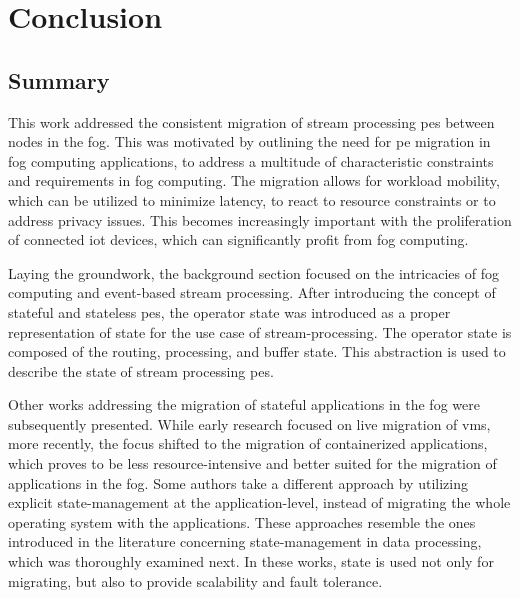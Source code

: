 \section{Conclusion}
\label{lConclusion}

\subsection{Summary}
\label{lSummary}

This work addressed the consistent migration of stream processing \gls{pe}s between nodes in the fog. This was motivated by outlining the need for \gls{pe} migration in fog computing applications, to address a multitude of characteristic constraints and requirements in fog computing. The migration allows for workload mobility, which can be utilized to minimize latency, to react to resource constraints or to address privacy issues. This becomes increasingly important with the proliferation of connected \gls{iot} devices, which can significantly profit from fog computing.\par

Laying the groundwork, the background section focused on the intricacies of fog computing and event-based stream processing. After introducing the concept of stateful and stateless \gls{pe}s, the operator state was introduced as a proper representation of state for the use case of stream-processing. The operator state is composed of the routing, processing, and buffer state. This abstraction is used to describe the state of stream processing \gls{pe}s.\par

Other works addressing the migration of stateful applications in the fog were subsequently presented. While early research focused on live migration of \gls{vm}s, more recently, the focus shifted to the migration of containerized applications, which proves to be less resource-intensive and better suited for the migration of applications in the fog. Some authors take a different approach by utilizing explicit state-management at the application-level, instead of migrating the whole operating system with the applications. These approaches resemble the ones introduced in the literature concerning state-management in data processing, which was thoroughly examined next. In these works, state is used not only for migrating, but also to provide scalability and fault tolerance.\par

